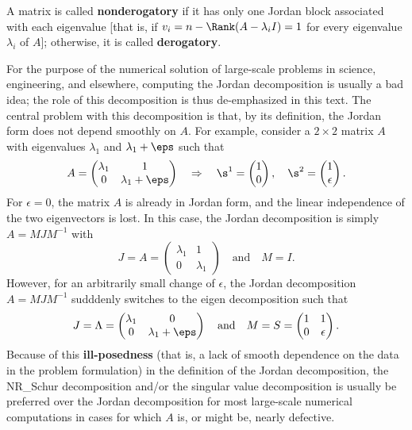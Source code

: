 A matrix is called {\bf nonderogatory} if it has only one Jordan block associated with each eigenvalue [that is, if $v_i=n-\Rank(A-\lambda_i I)=1$ for every eigenvalue $\lambda_i$ of $A$];
otherwise, it is called {\bf derogatory}.

For the purpose of the numerical solution of large-scale problems in
science, engineering, and elsewhere, computing the
Jordan decomposition is usually a bad idea; the role of this
decomposition is thus de-emphasized in this text.  The central problem with
this decomposition is that, by its definition, the Jordan form does
not depend smoothly on $A$.  For example, consider a $2\times 2$
matrix $A$ with eigenvalues $\lambda_{1}$ and $\lambda_{1}+\eps$ such
that
\begin{equation}
    A=\begin{pmatrix}
     \lambda_{1} & 1 \\ 0 & \lambda_{1}+\eps
    \end{pmatrix} \quad \Rightarrow \quad
    \s^{1}=\begin{pmatrix} 1 \\ 0 \end{pmatrix}, \quad \s^{2}=\begin{pmatrix} 1 \\ \epsilon \end{pmatrix}.
    \label{A1example}
\end{equation}
For $\epsilon=0$, the matrix $A$ is already in Jordan form, and the
linear independence of the two eigenvectors is lost.  In this case,
the Jordan decomposition is simply $A=MJM^{-1}$ with
\begin{equation*}
    J=A=\begin{pmatrix}
	 \lambda_{1} & 1 \\ 0 & \lambda_{1}
	\end{pmatrix}\quad \textrm{and} \quad M=I.
\end{equation*}
However, for an arbitrarily small change of $\epsilon$, the Jordan
decomposition $A=MJM^{-1}$ sudddenly switches to the eigen decomposition such that
\begin{equation*}
	J=\Lambda=\begin{pmatrix} \lambda_{1} & 0 \\ 0 & \lambda_{1}+\eps
	\end{pmatrix} \quad \textrm{and} \quad M=S =\begin{pmatrix} 1 &
	1 \\ 0 & \epsilon \end{pmatrix}.
\end{equation*}
Because of this {\bf ill-posedness} (that is, a lack of smooth
dependence on the data in the problem formulation) in the definition
of the Jordan decomposition, the NR_Schur decomposition and/or the
singular value decomposition is usually be preferred over the Jordan
decomposition for most large-scale numerical computations in cases for which $A$ is, or
might be, nearly defective.

